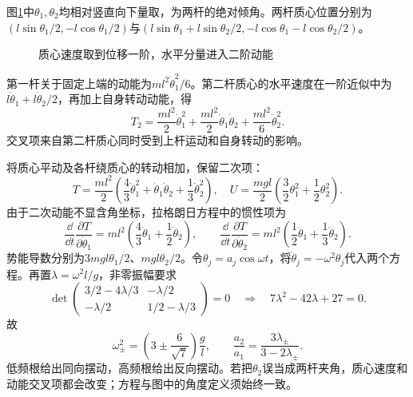 \begin{solution}
图\ref{fig:hw4-6-s}中$\theta_1,\theta_2$均相对竖直向下量取，为两杆的绝对倾角。两杆质心位置分别为$(l\sin\theta_1/2,-l\cos\theta_1/2)$与$(l\sin\theta_1+l\sin\theta_2/2,-l\cos\theta_1-l\cos\theta_2/2)$。

\begin{figure}[H]\centering
{}
\caption{质心速度取到位移一阶，水平分量进入二阶动能}\label{fig:hw4-6-s}
\end{figure}

第一杆关于固定上端的动能为$ml^2\dot\theta_1^2/6$。第二杆质心的水平速度在一阶近似中为$l\dot\theta_1+l\dot\theta_2/2$，再加上自身转动动能，得
\[
 T_2=\frac{ml^2}{2}\dot\theta_1^2+
 \frac{ml^2}{2}\dot\theta_1\dot\theta_2+
 \frac{ml^2}{6}\dot\theta_2^2.
\]
交叉项来自第二杆质心同时受到上杆运动和自身转动的影响。

将质心平动及各杆绕质心的转动相加，保留二次项：
\[
 T=\frac{ml^2}{2}\left(\frac43\dot\theta_1^2+\dot\theta_1\dot\theta_2+\frac13\dot\theta_2^2\right),
 \quad U=\frac{mgl}{2}\left(\frac32\theta_1^2+\frac12\theta_2^2\right).
\]
由于二次动能不显含角坐标，拉格朗日方程中的惯性项为
\[
\frac{\dd}{\dd t}\frac{\partial T}{\partial\dot\theta_1}
=ml^2\left(\frac43\ddot\theta_1+\frac12\ddot\theta_2\right),\qquad
\frac{\dd}{\dd t}\frac{\partial T}{\partial\dot\theta_2}
=ml^2\left(\frac12\ddot\theta_1+\frac13\ddot\theta_2\right).
\]
势能导数分别为$3mgl\theta_1/2$、$mgl\theta_2/2$。令$\theta_j=a_j\cos\omega t$，将$\ddot\theta_j=-\omega^2\theta_j$代入两个方程。再置$\lambda=\omega^2l/g$，非零振幅要求
\[
 \det\begin{pmatrix}3/2-4\lambda/3&-\lambda/2\\-\lambda/2&1/2-\lambda/3\end{pmatrix}=0
 \quad\Longrightarrow\quad7\lambda^2-42\lambda+27=0.
\]
故
\[
 \boxed{\omega_\pm^2=\left(3\pm\frac6{\sqrt7}\right)\frac gl,
 \qquad\frac{a_2}{a_1}=\frac{3\lambda_\pm}{3-2\lambda_\pm}}.
\]
低频根给出同向摆动，高频根给出反向摆动。若把$\theta_2$误当成两杆夹角，质心速度和动能交叉项都会改变；方程与图中的角度定义须始终一致。



\end{solution}
